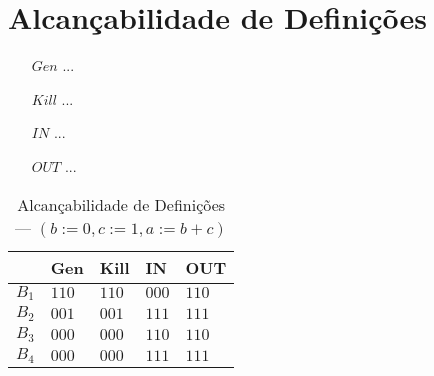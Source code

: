 \section{Alcan\c{c}abilidade de Defini\c{c}\~oes}

\begin{itemize}
  \item[$Gen$] ...
  \item[$Kill$] ...
  \item[$IN$] ...
  \item[$OUT$] ...
\end{itemize}

\begin{table}[ht]
\centering
\begin{tabular}{l|l|l|l|l}
	& Gen & Kill & IN & OUT\\
\hline
$B_{1}$ &  $110$ & $110$ & $000$ & $110$\\
$B_{2}$ &  $001$ & $001$ & $111$ & $111$\\
$B_{3}$ &  $000$ & $000$ & $110$ & $110$\\
$B_{4}$ &  $000$ & $000$ & $111$ & $111$\\
\end{tabular}
\caption{Alcan\c{c}abilidade de Defini\c{c}\~oes --- $(b:=0, c:=1, a:=b+c)$}
\end{table}

